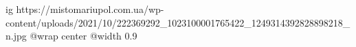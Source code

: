  
 
 
 
 

\ifcmt
  ig https://mistomariupol.com.ua/wp-content/uploads/2021/10/222369292_1023100001765422_1249314392828898218_n.jpg
  @wrap center
  @width 0.9
\fi
